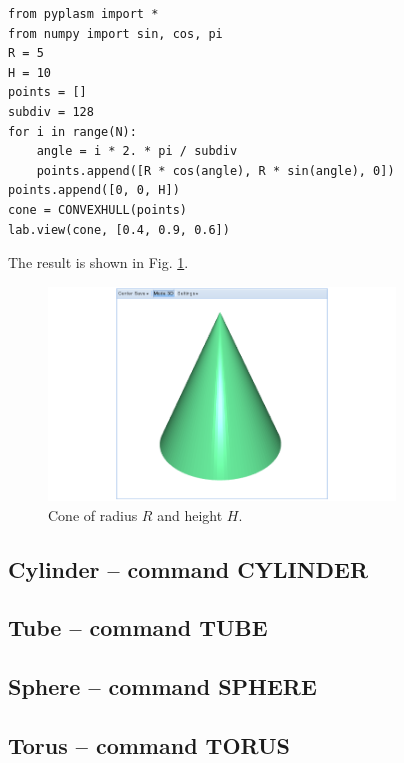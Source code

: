 \documentclass[article,A4,12pt]{llncs}
\begin{document}
\begin{verbatim}
from pyplasm import *
from numpy import sin, cos, pi
R = 5
H = 10
points = []
subdiv = 128
for i in range(N):
    angle = i * 2. * pi / subdiv
    points.append([R * cos(angle), R * sin(angle), 0])
points.append([0, 0, H])
cone = CONVEXHULL(points)
lab.view(cone, [0.4, 0.9, 0.6])
\end{verbatim}
The result is shown in Fig. \ref{fig:convexhull-2}.

\begin{figure}[!ht]
\begin{center}
\includegraphics[width=0.82\textwidth]{img/convexhull-2.png}
\end{center}
\vspace{-2mm}
\caption{Cone of radius $R$ and height $H$.}
\label{fig:convexhull-2}
\end{figure}
\noindent
\subsection{Cylinder -- command CYLINDER}



\subsection{Tube -- command TUBE}


\subsection{Sphere -- command SPHERE}



\subsection{Torus -- command TORUS}
\end{document}
